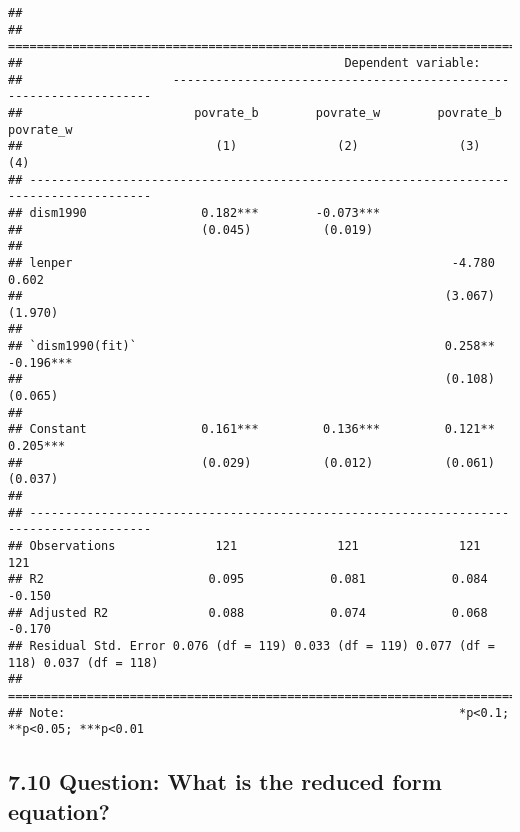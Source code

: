 \documentclass[
]{article}
\begin{document}
\begin{verbatim}
## 
## =======================================================================================
##                                             Dependent variable:                        
##                     -------------------------------------------------------------------
##                        povrate_b        povrate_w        povrate_b        povrate_w    
##                           (1)              (2)              (3)              (4)       
## ---------------------------------------------------------------------------------------
## dism1990                0.182***        -0.073***                                      
##                         (0.045)          (0.019)                                       
##                                                                                        
## lenper                                                     -4.780           0.602      
##                                                           (3.067)          (1.970)     
##                                                                                        
## `dism1990(fit)`                                           0.258**         -0.196***    
##                                                           (0.108)          (0.065)     
##                                                                                        
## Constant                0.161***         0.136***         0.121**          0.205***    
##                         (0.029)          (0.012)          (0.061)          (0.037)     
##                                                                                        
## ---------------------------------------------------------------------------------------
## Observations              121              121              121              121       
## R2                       0.095            0.081            0.084            -0.150     
## Adjusted R2              0.088            0.074            0.068            -0.170     
## Residual Std. Error 0.076 (df = 119) 0.033 (df = 119) 0.077 (df = 118) 0.037 (df = 118)
## =======================================================================================
## Note:                                                       *p<0.1; **p<0.05; ***p<0.01
\end{verbatim}

\clearpage

\hypertarget{question-what-is-the-reduced-form-equation}{%
\subsection{7.10 Question: What is the reduced form
equation?}\label{question-what-is-the-reduced-form-equation}}
\end{document}
